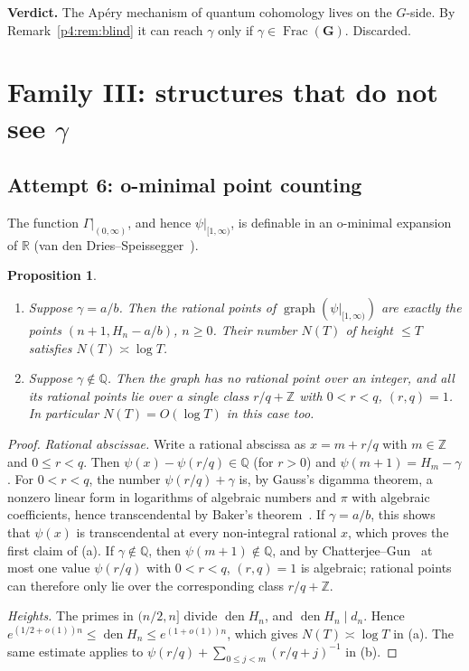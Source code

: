 \documentclass[11pt,a4paper]{article}
\newtheorem{proposition}[theorem]{Proposition}
\theoremstyle{definition}
\theoremstyle{remark}
\newcommand{\Q}{\mathbb Q}
\newcommand{\Z}{\mathbb Z}
\newcommand{\R}{\mathbb R}
\newcommand{\bG}{\mathbf G}
\DeclareMathOperator{\den}{den}
\DeclareMathOperator{\Frac}{Frac}
\numberwithin{equation}{section}
\begin{document}
\noindent\textbf{Verdict.} The Ap\'ery mechanism of quantum cohomology lives on the $G$-side. By Remark~\ref{p4:rem:blind} it can reach $\gamma$ only if $\gamma\in\Frac(\bG)$. Discarded.

\section{\texorpdfstring{Family III: structures that do not see $\gamma$}{Family III: structures that do not see gamma}}\label{p4:sec:blind}

\subsection{Attempt 6: o-minimal point counting}

The function $\Gamma|_{(0,\infty)}$, and hence $\psi|_{[1,\infty)}$, is definable in an o-minimal expansion of $\R$ (van den Dries--Speissegger~\cite{p4:vdDS}).

\begin{proposition}\label{p4:prop:omin}
\begin{enumerate}[label=(\alph*),leftmargin=2em]
\item Suppose $\gamma=a/b$. Then the rational points of $\operatorname{graph}(\psi|_{[1,\infty)})$ are exactly the points $(n+1,H_n-a/b)$, $n\ge0$. Their number $N(T)$ of height $\le T$ satisfies $N(T)\asymp\log T$.
\item Suppose $\gamma\notin\Q$. Then the graph has no rational point over an integer, and all its rational points lie over a single class $r/q+\Z$ with $0<r<q$, $(r,q)=1$. In particular $N(T)=O(\log T)$ in this case too.
\end{enumerate}
\end{proposition}

\begin{proof}
\emph{Rational abscissae.} Write a rational abscissa as $x=m+r/q$ with $m\in\Z$ and $0\le r<q$. Then $\psi(x)-\psi(r/q)\in\Q$ (for $r>0$) and $\psi(m+1)=H_m-\gamma$. For $0<r<q$, the number $\psi(r/q)+\gamma$ is, by Gauss's digamma theorem, a nonzero linear form in logarithms of algebraic numbers and $\pi$ with algebraic coefficients, hence transcendental by Baker's theorem~\cite{p4:MS07}. If $\gamma=a/b$, this shows that $\psi(x)$ is transcendental at every non-integral rational $x$, which proves the first claim of (a). If $\gamma\notin\Q$, then $\psi(m+1)\notin\Q$, and by Chatterjee--Gun~\cite{p4:CG} at most one value $\psi(r/q)$ with $0<r<q$, $(r,q)=1$ is algebraic; rational points can therefore only lie over the corresponding class $r/q+\Z$.

\emph{Heights.} The primes in $(n/2,n]$ divide $\den H_n$, and $\den H_n\mid d_n$. Hence $e^{(1/2+o(1))n}\le\den H_n\le e^{(1+o(1))n}$, which gives $N(T)\asymp\log T$ in (a). The same estimate applies to $\psi(r/q)+\sum_{0\le j<m}(r/q+j)^{-1}$ in (b).
\end{proof}
\end{document}
